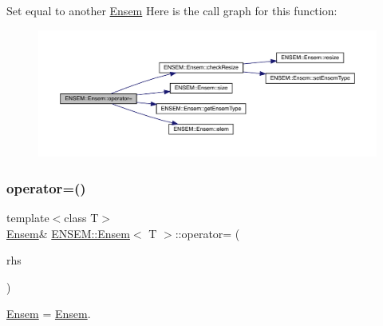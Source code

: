 Set equal to another \mbox{\hyperlink{classENSEM_1_1Ensem}{Ensem}} Here is the call graph for this function\+:
\nopagebreak
\begin{figure}[H]
\begin{center}
\leavevmode
\includegraphics[width=350pt]{d7/d3e/classENSEM_1_1Ensem_a2f4f881dde88dfaf425051580e477e6c_cgraph}
\end{center}
\end{figure}
\mbox{\label{classENSEM_1_1Ensem_a2f4f881dde88dfaf425051580e477e6c}} 
\subsubsection{\texorpdfstring{operator=()}{operator=()}\hspace{0.1cm}{\footnotesize\ttfamily [8/10]}}
{\footnotesize\ttfamily template$<$class T$>$ \\
\mbox{\hyperlink{classENSEM_1_1Ensem}{Ensem}}\& \mbox{\hyperlink{classENSEM_1_1Ensem}{E\+N\+S\+E\+M\+::\+Ensem}}$<$ T $>$\+::operator= (\begin{DoxyParamCaption}\item[{const \mbox{\hyperlink{classENSEM_1_1Ensem}{Ensem}}$<$ T $>$ \&}]{rhs }\end{DoxyParamCaption})\hspace{0.3cm}{\ttfamily [inline]}}



\mbox{\hyperlink{classENSEM_1_1Ensem}{Ensem}} = \mbox{\hyperlink{classENSEM_1_1Ensem}{Ensem}}. 

